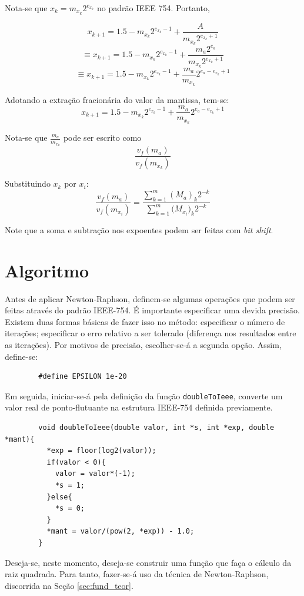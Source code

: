 	Nota-se que $x_k = m_{x_k}2^{e_{x_k}}$ no padrão IEEE 754. Portanto,

	$$x_{k+1} = 1.5 - m_{x_k}2^{e_{x_k} - 1} + \frac{A}{m_{x_k}2^{e_{x_k} +1}}$$
	$$\equiv x_{k+1} = 1.5 - m_{x_k}2^{e_{x_k} - 1} + \frac{m_a2^{e_a}}{m_{x_k}2^{e_{x_k} +1}}$$
	$$\equiv x_{k+1} = 1.5 - m_{x_k}2^{e_{x_k} - 1} + \frac{m_a}{m_{x_k}}2^{e_a - e_{x_k} + 1}$$

	Adotando a extração fracionária do valor da mantissa, tem-se:
	$$x_{k+1} = 1.5 - m_{x_k}2^{e_{x_k} - 1} + \frac{m_a}{m_{x_k}}2^{e_a - e_{x_k} + 1}$$

	Nota-se que $\frac{m_a}{m_{x_k}}$ pode ser escrito como
	$$\frac{v_f(m_a)}{v_f(m_{x_k})}$$

	Substituindo $x_k$ por $x_i$:
	$$\frac{v_f(m_a)}{v_f(m_{x_i})} = \frac{\sum_{k=1}^{m}{(M_a)_k2^{-k}}}{\sum_{k=1}^{m}{({M_{x_i})_k2^{-k}}}}$$

	Note que a soma e subtração nos expoentes podem ser feitas com \textit{bit shift}.

	\section{Algoritmo}

	Antes de aplicar Newton-Raphson, definem-se algumas operações que podem ser feitas através do
	padrão IEEE-754. É importante especificar uma devida precisão. Existem duas formas básicas de fazer isso no método:
	especificar o número de iterações; especificar o erro relativo a ser tolerado (diferença nos resultados entre as iterações).
	Por motivos de precisão, escolher-se-á a segunda opção. Assim, define-se:
	\begin{verbatim}
		#define EPSILON 1e-20
	\end{verbatim}

	Em seguida, iniciar-se-á pela definição da função \verb*|doubleToIeee|,
	converte um valor real de ponto-flutuante na estrutura IEEE-754 definida
	previamente.

	\begin{verbatim}
		void doubleToIeee(double valor, int *s, int *exp, double *mant){
		  *exp = floor(log2(valor));
		  if(valor < 0){
		    valor = valor*(-1);
		    *s = 1;
		  }else{
		    *s = 0;
		  }
		  *mant = valor/(pow(2, *exp)) - 1.0;
		}
	\end{verbatim}

	Deseja-se, neste momento, deseja-se construir uma função que faça o cálculo da raiz
	quadrada. Para tanto, fazer-se-á uso da técnica de Newton-Raphson, discorrida na Seção
	\ref{sec:fund_teor}.

